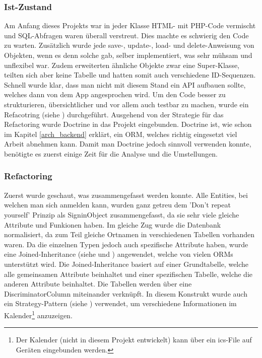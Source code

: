 \subsubsection{Ist-Zustand}
Am Anfang dieses Projekts war in jeder Klasse HTML- mit PHP-Code vermischt und SQL-Abfragen waren überall verstreut. Dies machte es schwierig den Code zu warten. Zusätzlich wurde jede save-, update-, load- und delete-Anweisung von Objekten, wenn es denn solche gab, selber implementiert, was sehr mühsam und unflexibel war. Zudem erweiterten ähnliche Objekte zwar eine Super-Klasse, teilten sich aber keine Tabelle und hatten somit auch verschiedene ID-Sequenzen.\\

Schnell wurde klar, dass man nicht mit diesem Stand ein API aufbauen sollte, welches dann von dem App angesprochen wird. Um den Code besser zu strukturieren, übersichtlicher und vor allem auch testbar zu machen, wurde ein Refacotring (siehe \cite{feathers2004working}) durchgeführt. Ausgehend von der Strategie für das Refactoring wurde Doctrine in das Projekt eingebunden. Doctrine ist, wie schon im Kapitel \ref{arch_backend} erklärt, ein ORM, welches richtig eingesetzt viel Arbeit abnehmen kann. Damit man Doctrine jedoch sinnvoll verwenden konnte, benötigte es zuerst einige Zeit für die Analyse und die Umstellungen.

\subsubsection{Refactoring}
Zuerst wurde geschaut, was zusammengefasst werden konnte. Alle Entities, bei welchen man sich anmelden kann, wurden ganz getreu dem 'Don’t repeat yourself' Prinzip als SigninObject zusammengefasst, da sie sehr viele gleiche Attribute und Funkionen haben. Im gleiche Zug wurde die Datenbank normalisiert, da zum Teil gleiche Ortnamen in verschiedenen Tabellen vorhanden waren. Da die einzelnen Typen jedoch auch spezifische Attribute haben, wurde eine Joined-Inheritance (siehe \cite{inheritance_java} und \cite{inheritance_doctrine}) angewendet, welche von vielen ORMs unterstützt wird. Die Joined-Inheritance basiert auf einer Grundtabelle, welche alle gemeinsamen Attribute beinhaltet und einer spezifischen Tabelle, welche die anderen Attribute beinhaltet. Die Tabellen werden über eine DiscriminatorColumn miteinander verknüpft. In diesem Konstrukt wurde auch ein Strategy-Pattern (siehe \cite{gof_book}) verwendet, um verschiedene Informationen im Kalender\footnote{Der Kalender (nicht in diesem Projekt entwickelt) kann über ein ics-File auf Geräten eingebunden werden.} anzuzeigen.\\


